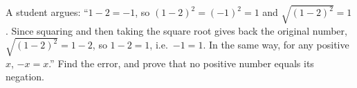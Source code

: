 A student argues: ``$1-2=-1$, so $(1-2)^2=(-1)^2=1$ and $\sqrt{(1-2)^2}=1$. Since squaring and then taking the square root gives back the original number, $\sqrt{(1-2)^2}=1-2$, so $1-2=1$, i.e.\ $-1=1$. In the same way, for any positive $x$, $-x=x$.'' Find the error, and prove that no positive number equals its negation.
